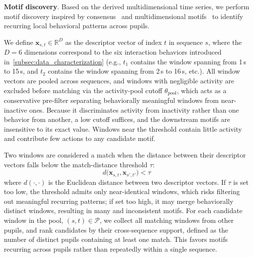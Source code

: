 \documentclass[letterpaper,journal]{IEEEtran}
\begin{document}
\noindent
\textbf{Motif discovery}.
Based on the derived multidimensional time series, we perform motif discovery inspired by consensus~\cite{kamgar2019matrix} and multidimensional motifs~\cite{yeh2017matrix} to identify recurring local behavioral patterns across pupils.

We define $\mathbf{x}_{s,t} \in \mathbb{R}^D$ as the descriptor vector of index $t$ in sequence $s$, where the $D=6$ dimensions correspond to the six interaction behaviors introduced in~\cref{subsec:data_characterization} (e.g., $t_1$ contains the window spanning from 1\,s to 15\,s, and $t_2$ contains the window spanning from 2\,s to 16\,s, etc.).
All window vectors are pooled across sequences, and windows with negligible activity are excluded before matching via the activity-pool cutoff $\theta_{\mathrm{pool}}$, which acts as a conservative pre-filter separating behaviorally meaningful windows from near-inactive ones.
Because it discriminates activity from inactivity rather than one behavior from another, a low cutoff suffices, and the downstream motifs are insensitive to its exact value.
Windows near the threshold contain little activity and contribute few actions to any candidate motif.

Two windows are considered a match when the distance between their descriptor vectors falls below the match-distance threshold $\tau$:
\begin{equation}
d\bigl(\mathbf{x}_{s,t}, \mathbf{x}_{s',t'}\bigr) < \tau
\end{equation}
where $d(\cdot,\cdot)$ is the Euclidean distance between two descriptor vectors.
If $\tau$ is set too low, the threshold admits only near-identical windows, which risks filtering out meaningful recurring patterns; if set too high, it may merge behaviorally distinct windows, resulting in many and inconsistent motifs.
For each candidate window in the pool, $(s,t) \in \mathcal{P}$, we collect all matching windows from other pupils, and rank candidates by their cross-sequence support, defined as the number of distinct pupils containing at least one match.
This favors motifs recurring across pupils rather than repeatedly within a single sequence.
\end{document}
